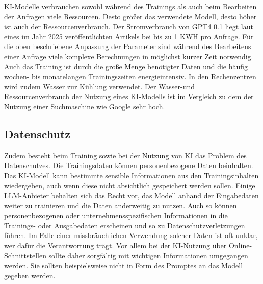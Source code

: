 \documentclass[../main.tex]{subfiles}
\begin{document}
KI-Modelle verbrauchen sowohl während des Trainings als auch beim Bearbeiten der Anfragen viele Ressourcen. Desto größer das verwendete Modell, desto höher ist auch der Ressourcenverbrauch. 
Der Stromverbrauch von GPT4 0.1 liegt laut eines im Jahr 2025 veröffentlichten Artikels bei bis zu 1 KWH pro Anfrage\cite{Energieverbrauch}. Für die oben beschriebene Anpassung der Parameter sind während des Bearbeitens einer Anfrage viele 
komplexe Berechnungen in möglichst kurzer Zeit notwendig. Auch das Training ist durch die große Menge benötigter Daten und die häufig wochen- bis monatelangen Trainingszeiten 
energieintensiv. In den Rechenzentren wird zudem Wasser zur Kühlung verwendet. Der Wasser-und Ressourcenverbrauch der Nutzung eines KI-Modells ist im Vergleich zu dem der Nutzung einer 
Suchmaschine wie Google sehr hoch\cite{KINachhaltigkeit}. 

\subsection{Datenschutz}

Zudem besteht beim Training sowie bei der Nutzung von KI das Problem des Datenschutzes. Die Trainingsdaten können personenbezogene Daten beinhalten. Das KI-Modell kann bestimmte sensible 
Informationen aus den Trainingsinhalten wiedergeben, auch wenn diese nicht absichtlich gespeichert werden sollen. Einige LLM-Anbieter behalten sich das Recht vor, das Modell anhand der 
Eingabedaten weiter zu trainieren und die Daten anderweitig zu nutzen. Auch so können personenbezogenen oder unternehmensspezifischen Informationen in die Trainings- oder Ausgabedaten 
erscheinen und so zu Datenschutzverletzungen führen. Im Falle einer missbräuchlichen Verwendung solcher Daten ist oft unklar, wer dafür die Verantwortung trägt. Vor allem bei der KI-Nutzung 
über Online-Schnittstellen sollte daher sorgfältig mit wichtigen Informationen umgegangen werden. Sie sollten beispielsweise nicht in Form des Promptes an das Modell gegeben werden.
\end{document}
